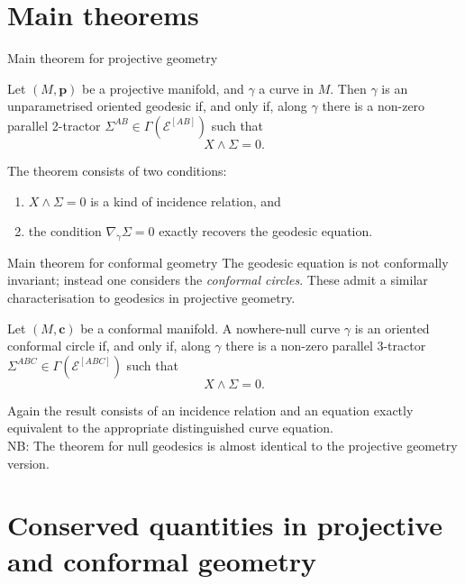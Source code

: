 \documentclass[handout]{beamer}
\begin{document}
\section{Main theorems}

\begin{frame}{Main theorem for projective geometry}
  \begin{Theorem}
    Let \( (M,\bm{p}) \) be a projective manifold, and \( \gamma \) a curve in \(
    M \).
    Then \( \gamma \) is an unparametrised oriented geodesic if, and only if,
    along \( \gamma \) there is a non-zero parallel 2-tractor \( \Sigma^{A B}\in
    \Gamma\left( \mathcal{E}^{ [A B] }\right) \) such that
    \[
      X \wedge \Sigma = 0.
    \]
  \end{Theorem}
  \pause
  The theorem consists of two conditions:\\
  \begin{enumerate}
    \pause
    \item \( X \wedge \Sigma = 0\) is a kind of incidence relation, and
    \pause
    \item the condition \( \nabla_{\dot{\gamma}} \Sigma = 0 \) exactly recovers the geodesic equation.
  \end{enumerate}
\end{frame}

\begin{frame}{Main theorem for conformal geometry}
  The geodesic equation is not conformally invariant; instead one considers the
  \emph{conformal circles}.
  These admit a similar characterisation to geodesics in projective geometry.
  \pause
  \begin{Theorem}
    Let \( (M,\bm{c}) \) be a conformal manifold.
    A nowhere-null curve \( \gamma \) is an oriented conformal circle if, and
    only if, along \( \gamma \) there is a non-zero parallel 3-tractor \(
    \Sigma^{ABC} \in \Gamma(\mathcal{E}^{[ABC]}) \) such that
    \[
      X \wedge \Sigma = 0.
    \]
  \end{Theorem}
  \pause
  Again the result consists of an incidence relation and an equation exactly
  equivalent to the appropriate distinguished curve equation.
  \pause
  \hspace{1em}\\
  NB: The theorem for null geodesics is almost identical to the projective geometry version.
\end{frame}

\section{Conserved quantities in projective and conformal geometry}
\end{document}
